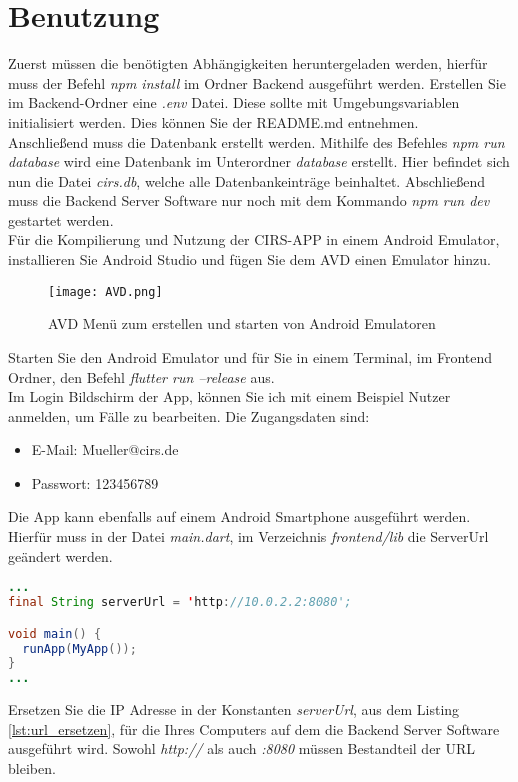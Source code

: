 \section{Benutzung}
\label{benutzung}
Zuerst müssen die benötigten Abhängigkeiten heruntergeladen werden, hierfür muss der Befehl \textit{npm install} im Ordner Backend ausgeführt werden. Erstellen Sie im Backend-Ordner eine \textit{.env} Datei. Diese sollte mit Umgebungsvariablen initialisiert werden. Dies können Sie der README.md entnehmen.\\
Anschließend muss die Datenbank erstellt werden. Mithilfe des Befehles \textit{npm run database} wird eine Datenbank im Unterordner \textit{database} erstellt. Hier befindet sich nun die Datei \textit{cirs.db}, welche alle Datenbankeinträge beinhaltet. Abschließend muss die Backend Server Software nur noch mit dem Kommando \textit{npm run dev} gestartet werden.
\\[0.5cm]
Für die Kompilierung und Nutzung der CIRS-APP in einem Android Emulator, installieren Sie Android Studio und fügen Sie dem AVD einen Emulator hinzu.
\begin{figure}[hbt!]
\texttt{[image: AVD.png]}
\caption{AVD Menü zum erstellen und starten von Android Emulatoren}
\label{fig:avd}
\end{figure}
Starten Sie den Android Emulator und für Sie in einem Terminal, im Frontend Ordner, den Befehl \textit{flutter run --release} aus.
\\[0.5cm]
Im Login Bildschirm der App, können Sie ich mit einem Beispiel Nutzer anmelden, um Fälle zu bearbeiten. Die Zugangsdaten sind:
\begin{itemize}
\item E-Mail: Mueller@cirs.de
\item Passwort: 123456789
\end{itemize}
Die App kann ebenfalls auf einem Android Smartphone ausgeführt werden. Hierfür muss in der Datei \textit{main.dart}, im Verzeichnis \textit{frontend/lib} die ServerUrl geändert werden.
\begin{lstlisting}[language=Java, caption=ServerUrl ersetzen, label=lst:url_ersetzen]
...
final String serverUrl = 'http://10.0.2.2:8080';

void main() {
  runApp(MyApp());
}
...
\end{lstlisting}
Ersetzen Sie die IP Adresse in der Konstanten \textit{serverUrl}, aus dem Listing \ref{lst:url_ersetzen}, für die Ihres Computers auf dem die Backend Server Software ausgeführt wird. Sowohl \textit{http://} als auch \textit{:8080} müssen Bestandteil der URL bleiben.


